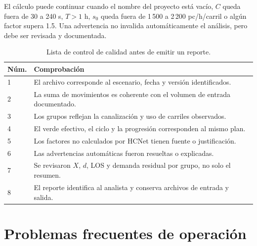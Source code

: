 \documentclass[11pt,letterpaper,oneside,openany]{report}
\begin{document}
El cálculo puede continuar cuando el nombre del proyecto está vacío, $C$ queda
fuera de 30 a 240 s, $T>1$ h, $s_0$ queda fuera de 1\,500 a 2\,200 pc/h/carril o
algún factor supera 1.5. Una advertencia no invalida automáticamente el análisis,
pero debe ser revisada y documentada.

\begin{table}[H]
\centering
\caption{Lista de control de calidad antes de emitir un reporte.}
\label{tab:control-calidad}
\begin{tabularx}{\textwidth}{@{}C{1.2cm}Y@{}}
\toprule
{}
\textbf{Núm.} & \textbf{Comprobación} \\
 & El archivo corresponde al escenario, fecha y versión identificados. \\
2 & La suma de movimientos es coherente con el volumen de entrada documentado. \\
3 & Los grupos reflejan la canalización y uso de carriles observados. \\
4 & El verde efectivo, el ciclo y la progresión corresponden al mismo plan. \\
5 & Los factores no calculados por HCNet tienen fuente o justificación. \\
6 & Las advertencias automáticas fueron resueltas o explicadas. \\
7 & Se revisaron $X$, $d$, LOS y demanda residual por grupo, no solo el resumen. \\
8 & El reporte identifica al analista y conserva archivos de entrada y salida. \\
\bottomrule
\end{tabularx}
\end{table}

\section{Problemas frecuentes de operación}
\end{document}
